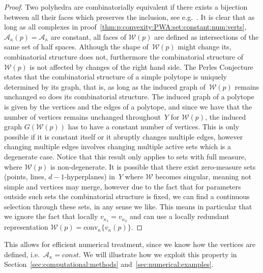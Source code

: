 \documentclass[a4paper, 12pt, twoside]{article}
\theoremstyle{definition}
\numberwithin{equation}{section}
\providecommand{\conv}{\text{conv}}
\begin{document}
\begin{proof}
Two polyhedra are combinatorially equivalent if there exists a bijection between all their faces which preserves the inclusion, see e.g.~\cite{Ziegler:1995}.
%
It is clear that as long as all complexes in proof~\ref{thm:p:convexity:PWA:set:constant:num:verts}, $\mathcal A_\kappa(p)=\mathcal A_\kappa$ are constant, all faces of $\mathcal W(p)$ are defined as intersections of the same set of half spaces.
%
Although the shape of~$\mathcal W(p)$ might change its, combinatorial structure does not, furthermore the combinatorial structure of $\mathcal W(p)$ is not affected by changes of the right hand side.
%
The Perles Conjecture~\cite{Kalai:1988} states that the combinatorial structure of a simple polytope is uniquely determined by its graph, that is, as long as the induced graph of~$\mathcal W(p)$ remains unchanged so does its combinatorial structure.
%
The induced graph of a polytope is given by the vertices and the edges of a polytope, and since we have that the number of vertices remains unchanged throughout~$Y$ for $\mathcal W(p)$, the induced graph $G(\mathcal W(p))$ has to have a constant number of vertices.
%
This is only possible if it is constant itself or it abruptly changes multiple edges, however changing multiple edges involves changing multiple active sets which is a degenerate case.
%
Notice that this result only applies to sets with full measure, where $\mathcal W(p)$ is non-degenerate.
%
It is possible that there exist zero-measure sets (points, lines, $d-1$-hyperplanes) in~$Y$ where $\mathcal W$ becomes singular, meaning not simple
and vertices may merge, however due to the fact that for parameters outside such sets the combinatorial structure is fixed, we can find a  continuous selection through these sets, in any sense we like.
%
This means in particular that we ignore the fact that locally $v_{\kappa_1}=v_{\kappa_2}$ and can
 use a locally redundant representation $\mathcal W(p) = \conv_\kappa\{v_\kappa(p)\}$.
\end{proof}
%
This allows for efficient numerical treatment, since we know how the vertices are defined, i.e.~$\mathcal A_\kappa = const$.
%
We will illustrate how we exploit this property in Section~\ref{sec:computational:methods} and~\ref{sec:numerical:examples}.
%
\end{document}
